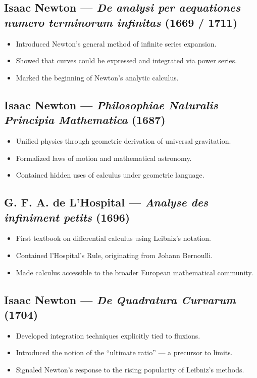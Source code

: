 \documentclass[9pt]{article}
\begin{document}
\subsection*{Isaac Newton — \textit{De analysi per aequationes numero terminorum infinitas} (1669 / 1711)}
\begin{itemize}
  \item Introduced Newton’s general method of infinite series expansion.
  \item Showed that curves could be expressed and integrated via power series.
  \item Marked the beginning of Newton’s analytic calculus.
\end{itemize}

\subsection*{Isaac Newton — \textit{Philosophiae Naturalis Principia Mathematica} (1687)}
\begin{itemize}
  \item Unified physics through geometric derivation of universal gravitation.
  \item Formalized laws of motion and mathematical astronomy.
  \item Contained hidden uses of calculus under geometric language.
\end{itemize}

\subsection*{G. F. A. de L’Hospital — \textit{Analyse des infiniment petits} (1696)}
\begin{itemize}
  \item First textbook on differential calculus using Leibniz’s notation.
  \item Contained l’Hospital’s Rule, originating from Johann Bernoulli.
  \item Made calculus accessible to the broader European mathematical community.
\end{itemize}

\subsection*{Isaac Newton — \textit{De Quadratura Curvarum} (1704)}
\begin{itemize}
  \item Developed integration techniques explicitly tied to fluxions.
  \item Introduced the notion of the “ultimate ratio” — a precursor to limits.
  \item Signaled Newton’s response to the rising popularity of Leibniz’s methods.
\end{itemize}
\end{document}
